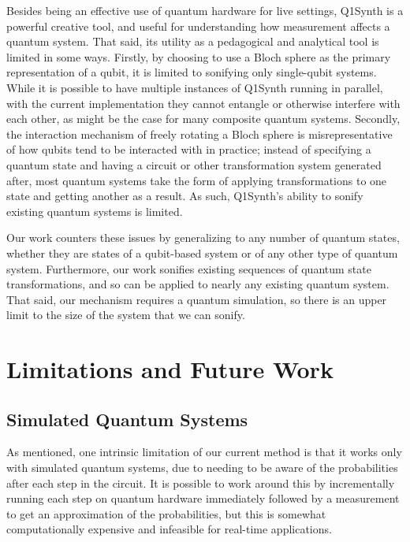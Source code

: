 \documentclass[10pt,twocolumn]{article}
\begin{document}
Besides being an effective use of quantum hardware for live settings, Q1Synth is a powerful creative tool, and useful for understanding how measurement affects a quantum system. That said, its utility as a pedagogical and analytical tool is limited in some ways. Firstly, by choosing to use a Bloch sphere as the primary representation of a qubit, it is limited to sonifying only single-qubit systems. While it is possible to have multiple instances of Q1Synth running in parallel, with the current implementation they cannot entangle or otherwise interfere with each other, as might be the case for many composite quantum systems. Secondly, the interaction mechanism of freely rotating a Bloch sphere is misrepresentative of how qubits tend to be interacted with in practice; instead of specifying a quantum state and having a circuit or other transformation system generated after, most quantum systems take the form of applying transformations to one state and getting another as a result\cite{qmdistilled}. As such, Q1Synth’s ability to sonify existing quantum systems is limited.

Our work counters these issues by generalizing to any number of quantum states, whether they are states of a qubit-based system or of any other type of quantum system. Furthermore, our work sonifies existing sequences of quantum state transformations, and so can be applied to nearly any existing quantum system. That said, our mechanism requires a quantum simulation, so there is an upper limit to the size of the system that we can sonify.

\section{Limitations and Future Work}

\subsection{Simulated Quantum Systems}

As mentioned, one intrinsic limitation of our current method is that it works only with simulated quantum systems, due to needing to be aware of the probabilities after each step in the circuit. It is possible to work around this by incrementally running each step on quantum hardware immediately followed by a measurement to get an approximation of the probabilities, but this is somewhat computationally expensive and infeasible for real-time applications\cite{qiskitalgos}.
\end{document}
